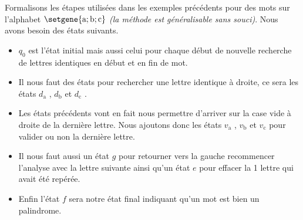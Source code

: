 Formalisons les étapes utilisées dans les exemples précédents pour des mots sur l'alphabet $\setgene{\text{a} ; \text{b} ; \text{c}}$ \emph{(la méthode est généralisable sans souci)}. Nous avons besoin des états suivants.

\begin{itemize}[label = \small\textbullet]
	\item $q_0$ est l'état initial mais aussi celui pour chaque début de nouvelle recherche de lettres identiques en début et en fin de mot.

	\item Il nous faut des états pour rechercher une lettre identique à droite, ce sera les états $d_\text{a}$ , $d_\text{b}$ et $d_\text{c}$ .
	
	\item Les états précédents vont en fait nous permettre d'arriver sur la case vide à droite de la dernière lettre. Nous ajoutons donc les états $v_\text{a}$ , $v_\text{b}$ et $v_\text{c}$ pour valider ou non la dernière lettre.
	
	\item Il nous faut aussi un état $g$ pour retourner vers la gauche recommencer l'analyse avec la lettre suivante ainsi qu'un état $e$ pour effacer la 1\iere{} lettre qui avait été repérée.
	
	\item Enfin l'état $f$ sera notre état final indiquant qu'un mot est bien un palindrome.
\end{itemize}

